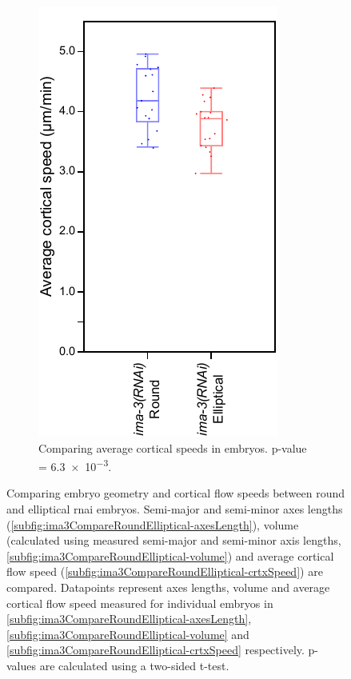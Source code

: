 \begin{figure}
\begin{subfigure}[t]{0.3\textwidth}
    \includegraphics[width=\textwidth]{Results/FigIma3RoundElliptical/crtxSpeed.pdf}
    \caption{Comparing average cortical speeds in embryos. p-value = \num{6.3e-3}.} 
    \label{subfig:ima3CompareRoundElliptical-crtxSpeed}
\end{subfigure}
\caption[Comparing embryos between subsets of  \acs{rnai} embryos]{Comparing embryo geometry and cortical flow speeds between round and elliptical  \ac{rnai} embryos. Semi-major \longAxisLength and semi-minor \shortAxisLength axes lengths (\autoref{subfig:ima3CompareRoundElliptical-axesLength}), volume (calculated using measured semi-major and semi-minor axis lengths, \autoref{subfig:ima3CompareRoundElliptical-volume}) and average cortical flow speed (\autoref{subfig:ima3CompareRoundElliptical-crtxSpeed}) are compared. Datapoints represent axes lengths, volume and average cortical flow speed measured for individual embryos in \autoref{subfig:ima3CompareRoundElliptical-axesLength}, \autoref{subfig:ima3CompareRoundElliptical-volume} and \autoref{subfig:ima3CompareRoundElliptical-crtxSpeed} respectively. p-values are calculated using a two-sided t-test.}

\end{figure}
